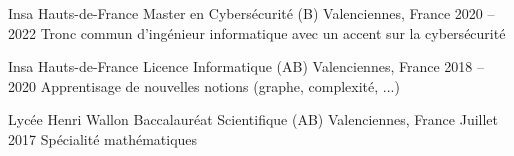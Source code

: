 
\begin{cventries}
  \cventry
    {Insa Hauts-de-France} %
    {Master en Cybersécurité (B)} %
    {Valenciennes, France} %
    {2020 – 2022} %
    {Tronc commun d'ingénieur informatique avec un accent sur la cybersécurité}
    
  \cventry
    {Insa Hauts-de-France} %
    {Licence Informatique (AB)} %
    {Valenciennes, France} %
    {2018 – 2020} %
    {Apprentisage de nouvelles notions (graphe, complexité, ...)}

  \cventry
    {Lycée Henri Wallon} %
    {Baccalauréat Scientifique (AB)} %
    {Valenciennes, France} %
    {Juillet 2017} %
    {Spécialité mathématiques}
\end{cventries}
